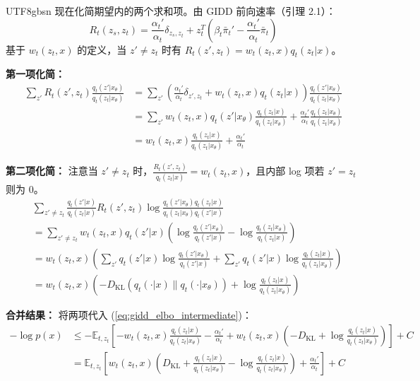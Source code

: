 \documentclass[11pt,a4paper]{article}
\newcommand{\Dkl}{D_{\mathrm{KL}}}
\begin{document}
\begin{CJK}{UTF8}{gbsn}
现在化简期望内的两个求和项。由 GIDD 前向速率（引理 2.1）：
\[
R_t(z_s, z_t) = \frac{\alpha_t'}{\alpha_t}\delta_{z_s,z_t} + z_t^T\left(\beta_t\bar{\pi}_t' - \frac{\alpha_t'}{\alpha_t}\bar{\pi}_t\right)
\]
基于 $w_t(z_t, x)$ 的定义，当 $z' \neq z_t$ 时有 $R_t(z', z_t) = w_t(z_t, x) q_t(z_t|x)$。

\textbf{第一项化简：}
\begin{align*}
\sum_{z'} R_t(z', z_t) \frac{q_t(z'|x_\theta)}{q_t(z_t|x_\theta)} &= \sum_{z'} \left(\frac{\alpha_t'}{\alpha_t}\delta_{z',z_t} + w_t(z_t, x)q_t(z_t|x)\right) \frac{q_t(z'|x_\theta)}{q_t(z_t|x_\theta)} \\
&= \sum_{z'} w_t(z_t, x) q_t(z'|x_\theta) \frac{q_t(z_t|x)}{q_t(z_t|x_\theta)} + \frac{\alpha_t'}{\alpha_t} \frac{q_t(z_t|x_\theta)}{q_t(z_t|x_\theta)} \\
&= w_t(z_t, x) \frac{q_t(z_t|x)}{q_t(z_t|x_\theta)} + \frac{\alpha_t'}{\alpha_t}
\end{align*}

\textbf{第二项化简：}
注意当 $z' \neq z_t$ 时，$\frac{R_t(z', z_t)}{q_t(z_t|x)} = w_t(z_t, x)$，且内部 log 项若 $z' = z_t$ 则为 0。
\begin{align*}
&\sum_{z' \neq z_t} \frac{q_t(z'|x)}{q_t(z_t|x)} R_t(z', z_t) \log \frac{q_t(z'|x_\theta) q_t(z_t|x)}{q_t(z_t|x_\theta) q_t(z'|x)} \\
&= \sum_{z' \neq z_t} w_t(z_t, x) q_t(z'|x) \left( \log \frac{q_t(z'|x_\theta)}{q_t(z'|x)} - \log \frac{q_t(z_t|x_\theta)}{q_t(z_t|x)} \right) \\
&= w_t(z_t, x) \left( \sum_{z'} q_t(z'|x) \log \frac{q_t(z'|x_\theta)}{q_t(z'|x)} + \sum_{z'} q_t(z'|x) \log \frac{q_t(z_t|x)}{q_t(z_t|x_\theta)} \right) \\
&= w_t(z_t, x) \left( -\Dkl(q_t(\cdot|x) \| q_t(\cdot|x_\theta)) + \log \frac{q_t(z_t|x)}{q_t(z_t|x_\theta)} \right)
\end{align*}

\textbf{合并结果：}
将两项代入 (\ref{eq:gidd_elbo_intermediate})：
\begin{align*}
-\log p(x) &\leq -\mathbb{E}_{t, z_t} \left[-w_t(z_t, x) \frac{q_t(z_t|x)}{q_t(z_t|x_\theta)} - \frac{\alpha_t'}{\alpha_t} + w_t(z_t, x) \left( -\Dkl + \log \frac{q_t(z_t|x)}{q_t(z_t|x_\theta)} \right)\right] + C \\
&= \mathbb{E}_{t, z_t} \left[ w_t(z_t, x) \left( \Dkl + \frac{q_t(z_t|x)}{q_t(z_t|x_\theta)} - \log \frac{q_t(z_t|x)}{q_t(z_t|x_\theta)} \right) + \frac{\alpha_t'}{\alpha_t} \right] + C
\end{align*}


\end{CJK}
\end{document}
